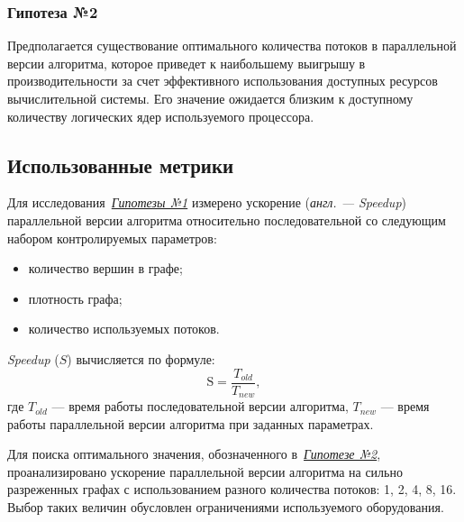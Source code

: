 \subsubsection*{Гипотеза №2}
\label{t2}
\noindent Предполагается существование оптимального количества потоков в параллельной версии алгоритма, которое приведет к наибольшему выигрышу в производительности за счет эффективного использования доступных ресурсов вычислительной системы. Его значение ожидается близким к доступному количеству логических ядер используемого процессора.



\subsection{Использованные метрики}
\noindent Для исследования~\hyperref[t1]{\textit{Гипотезы №1}} измерено ускорение (\textit{англ. --- Speedup}) параллельной версии алгоритма относительно последовательной со следующим набором контролируемых параметров:
\begin{itemize}
    \item количество вершин в графе;
    \item плотность графа;
    \item количество используемых потоков.
\end{itemize}
\textit{Speedup} ($S$) вычисляется по формуле:
\begin{equation}
\label{eq:speedup}
	\text{S} = \frac{T_{old}}{T_{new}},
\end{equation}
где $T_{old}$ --- время работы последовательной версии алгоритма, $T_{new}$ --- время работы параллельной версии алгоритма при заданных параметрах.

Для поиска оптимального значения, обозначенного в~\hyperref[t2]{\textit{Гипотезе №2}}, проанализировано ускорение параллельной версии алгоритма на сильно разреженных графах с использованием разного количества потоков: 1, 2, 4, 8, 16. Выбор таких величин обусловлен ограничениями используемого оборудования.



